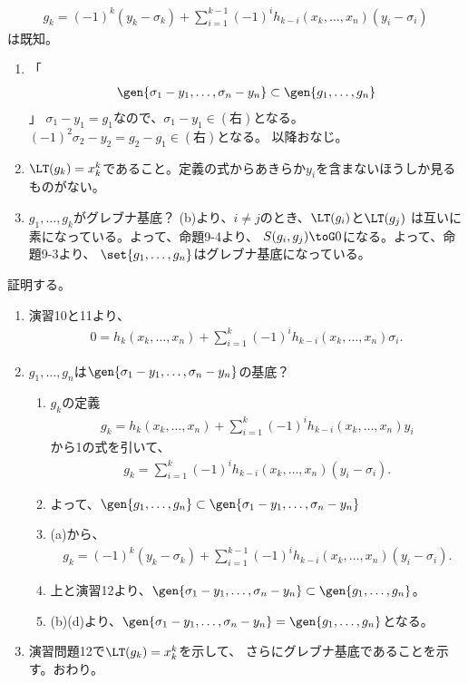 \begin{myproof}
\begin{align}
    g_k = (-1)^k (y_k-\sigma_k) +
    \sum_{i=1}^{k-1}(-1)^i h_{k-i}(x_k,\dots,x_n)(y_i-\sigma_i)
  \end{align}
  は既知。
  \begin{enumerate}[label=(\alph*)]
    \item
    「
      \begin{align}
        \gen{\sigma_1-y_1,\dots,\sigma_n-y_n} \subset \gen{g_1,\dots,g_n}
      \end{align}
      」
    $\sigma_1 - y_1= g_1$なので、$\sigma_1 - y_1 \in (右)$となる。
    $(-1)^2\sigma_2 -y_2 = g_2 - g_1 \in (右)$となる。
    以降おなじ。
    \item
    $\LT(g_k) = x_k^k$であること。定義の式からあきらか$y_i$を含まないほうしか見るものがない。
    \item
    $g_1,\dots,g_k$がグレブナ基底？
    (b)より、$i\neq j$のとき、$\LT(g_i)$と$\LT(g_j)$
    は互いに素になっている。よって、命題9-4より、
    $S(g_i,g_j) \toG 0$になる。よって、命題9-3より、
    $\set{g_1,\dots,g_n}$はグレブナ基底になっている。
  \end{enumerate}
  証明する。
  \begin{enumerate}
    \item 演習10と11より、
    \begin{align}
      0=h_k(x_k,\dots,x_n) + \sum_{i=1}^k (-1)^i h_{k-i}(x_k,\dots,x_n)\sigma_i.
    \end{align}
    \item
    $g_1,\dots,g_n$は$\gen{\sigma_1-y_1,\dots,\sigma_n-y_n}$の基底？
    \begin{enumerate}
      \item
      $g_k$の定義
      \begin{align}
        g_k = h_k(x_k,\dots,x_n) + \sum_{i=1}^k (-1)^i h_{k-i}(x_k,\dots,x_n)y_i
      \end{align}
      から1の式を引いて、
      \begin{align}
        g_k = \sum_{i=1}^k (-1)^i h_{k-i}(x_k,\dots,x_n)(y_i-\sigma_i).
      \end{align}
      \item
      よって、$\gen{g_1,\dots,g_n}\subset \gen{\sigma_1-y_1,\dots,\sigma_n-y_n}$
      \item
      (a)から、
      \begin{align}
        g_k = (-1)^k (y_k-\sigma_k) +
        \sum_{i=1}^{k-1} (-1)^i h_{k-i}(x_k,\dots,x_n)(y_i-\sigma_i).
      \end{align}
      \item
      上と演習12より、$\gen{\sigma_1-y_1,\dots,\sigma_n-y_n} \subset \gen{g_1,\dots,g_n}$。
      \item
      (b)(d)より、$\gen{\sigma_1-y_1,\dots,\sigma_n-y_n} = \gen{g_1,\dots,g_n}$となる。
    \end{enumerate}
    \item
    演習問題12で$\LT(g_k)=x_k^k$を示して、
    さらにグレブナ基底であることを示す。おわり。
  \end{enumerate}
\end{myproof}

